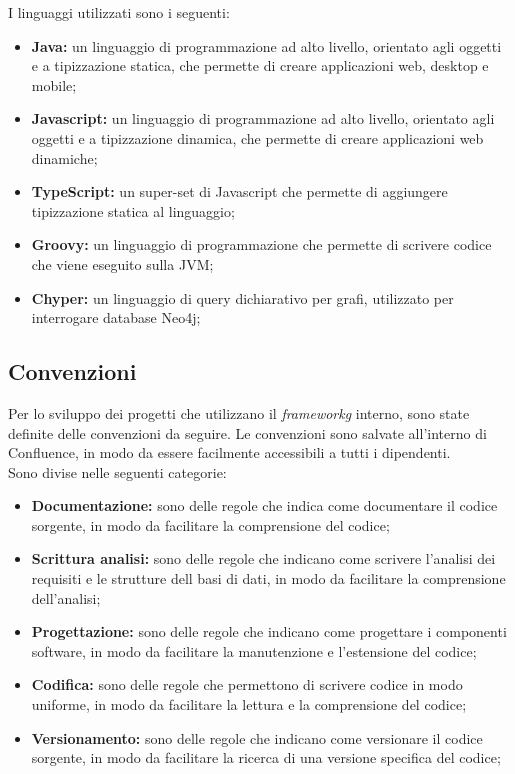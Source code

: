I linguaggi utilizzati sono i seguenti:\\

\begin{itemize}
  \item \textbf{Java:} un linguaggio di programmazione ad alto livello, orientato agli oggetti e a tipizzazione statica, che permette di creare applicazioni web, desktop e mobile;
  \item \textbf{Javascript:} un linguaggio di programmazione ad alto livello, orientato agli oggetti e a tipizzazione dinamica, che permette di creare applicazioni web dinamiche;
  \item \textbf{TypeScript:} un super-set di Javascript che permette di aggiungere tipizzazione statica al linguaggio;
  \item \textbf{Groovy:} un linguaggio di programmazione che permette di scrivere codice che viene eseguito sulla \gls{JVM};
  \item \textbf{Chyper:} un linguaggio di query dichiarativo per grafi, utilizzato per interrogare database \gls{Neo4j};
\end{itemize}

\subsection{Convenzioni}
Per lo sviluppo dei progetti che utilizzano il \textit{frameworkg} interno, sono state definite delle convenzioni da seguire.
Le convenzioni sono salvate all'interno di Confluence, in modo da essere facilmente accessibili a tutti i dipendenti. \\
Sono divise nelle seguenti categorie:
\begin{itemize}
  \item \textbf{Documentazione:} sono delle regole che indica come documentare il codice sorgente, in modo da facilitare la comprensione del codice;
  \item \textbf{Scrittura analisi:} sono delle regole che indicano come scrivere l'analisi dei requisiti e le strutture dell basi di dati, in modo da facilitare la comprensione dell'analisi;
  \item \textbf{Progettazione:} sono delle regole che indicano come progettare i componenti software, in modo da facilitare la manutenzione e l'estensione del codice;
  \item \textbf{Codifica:} sono delle regole che permettono di scrivere codice in modo uniforme, in modo da facilitare la lettura e la comprensione del codice;
  \item \textbf{Versionamento:} sono delle regole che indicano come versionare il codice sorgente, in modo da facilitare la ricerca di una versione specifica del codice;
\end{itemize}

